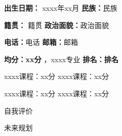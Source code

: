 \begin{onehalfspacing}
  \textbf{出生日期：}  xxxx年xx月\hspace{10.2em} \textbf{民\hspace{2em}族：}民\hspace{2em}族 \par
  \textbf{籍\hspace{2em}贯：} 籍\hspace{2em}贯 \hspace{9.5em} \textbf{政治面貌：}政治面貌\par
  \textbf{电\hspace{2em}话：}电话  \hspace{8em} \textbf{邮\hspace{2em}箱：}邮箱
\end{onehalfspacing}

\begin{onehalfspacing}
  \par
  \textbf{均分：xx分} ，xxxx专业 \textbf{排名：排名}
  \par
  xxxx课程：xx分 \hspace{10em} xxxx课程：xx分
  \par
  xxxx课程：xx分 \hspace{10em} xxxx课程：xx分

\end{onehalfspacing}

\begin{onehalfspacing}
\end{onehalfspacing}



\begin{onehalfspacing}


\end{onehalfspacing}

\begin{onehalfspacing}
自我评价

\end{onehalfspacing}

\begin{onehalfspacing}
未来规划

\end{onehalfspacing}